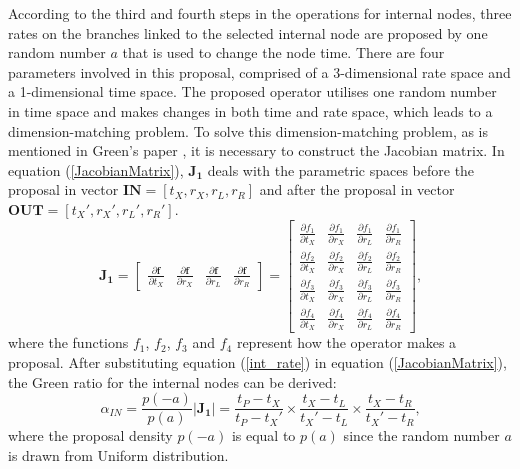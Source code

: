 \documentclass{bmcart}
\begin{document}
According to the third and fourth steps in the operations for internal nodes, three rates on the branches linked to the selected internal node are proposed by one random number $a$ that is used to change the node time. There are four parameters involved in this proposal, comprised of a 3-dimensional rate space and a 1-dimensional time space. The proposed operator utilises one random number in time space and makes changes in both time and rate space, which leads to a dimension-matching problem. To solve this dimension-matching problem, as is mentioned in Green's paper \cite{green1995reversible}, it is necessary to construct the Jacobian matrix.  In equation (\ref{JacobianMatrix}), ${\mathbf{J_1}}$ deals with the parametric spaces before the proposal in vector ${\mathbf{IN}} = [{t_X},{r_X},{r_L},{r_R}]$ and after the proposal in vector ${\mathbf{OUT}} = [{t_X}',{r_X}',{r_L}',{r_R}']$.
\begin{equation}\label{JacobianMatrix}
{\mathbf{J_1}} = \left[ {\begin{array}{*{20}{c}}
  {\frac{{\partial {\mathbf{f}}}}{{\partial {t_X}}}}&{\frac{{\partial {\mathbf{f}}}}{{\partial {r_X}}}}&{\frac{{\partial {\mathbf{f}}}}{{\partial {r_L}}}}&{\frac{{\partial {\mathbf{f}}}}{{\partial {r_R}}}}
\end{array}} \right] = \left[ {\begin{array}{*{20}{c}}
  {\frac{{\partial {f_1}}}{{\partial {t_X}}}}&{\frac{{\partial {f_1}}}{{\partial {r_X}}}}&{\frac{{\partial {f_1}}}{{\partial {r_L}}}}&{\frac{{\partial {f_1}}}{{\partial {r_R}}}} \\
  {\frac{{\partial {f_2}}}{{\partial {t_X}}}}&{\frac{{\partial {f_2}}}{{\partial {r_X}}}}&{\frac{{\partial {f_2}}}{{\partial {r_L}}}}&{\frac{{\partial {f_2}}}{{\partial {r_R}}}} \\
  {\frac{{\partial {f_3}}}{{\partial {t_X}}}}&{\frac{{\partial {f_3}}}{{\partial {r_X}}}}&{\frac{{\partial {f_3}}}{{\partial {r_L}}}}&{\frac{{\partial {f_3}}}{{\partial {r_R}}}} \\
  {\frac{{\partial {f_4}}}{{\partial {t_X}}}}&{\frac{{\partial {f_4}}}{{\partial {r_X}}}}&{\frac{{\partial {f_4}}}{{\partial {r_L}}}}&{\frac{{\partial {f_4}}}{{\partial {r_R}}}}
\end{array}} \right]\text{,}
\end{equation}
where the functions ${f_1}$, ${f_2}$, ${f_3}$ and ${f_4}$ represent how the operator makes a proposal. After substituting equation (\ref{int_rate}) in equation (\ref{JacobianMatrix}), the Green ratio for the internal nodes can be derived:
\begin{equation}\label{HR1}
{\alpha_{IN}} = \frac{{p ( - a)}}{{p (a)}}\left| {\mathbf{J_1}} \right| = \frac{{{t_P} - {t_X}}}{{{t_P} - {t_X}'}} \times \frac{{{t_X} - {t_L}}}{{{t_X}' - {t_L}}} \times \frac{{{t_X} - {t_R}}}{{{t_X}' - {t_R}}}\text{,}
\end{equation}
where the proposal density ${p ( - a)}$ is equal to ${p ( a )}$ since the random number $a$ is drawn from Uniform distribution.
\end{document}
